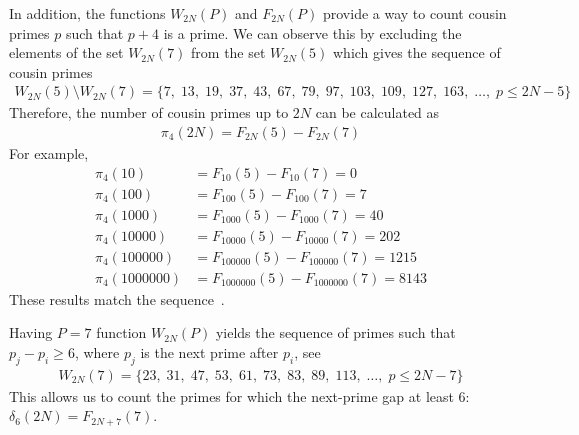 In addition, the functions $W_{2N}(P)$ and $F_{2N}(P)$ provide a way to count cousin
primes $p$ such that $p+4$ is a prime.
We can observe this by excluding the elements of the set $W_{2N}(7)$ from the set $W_{2N}(5)$ which gives
the sequence of cousin primes~\cite{oeis:A023200}
\begin{align*}
    W_{2N}(5) \setminus W_{2N}(7) = \{ 7, \; 13, \; 19, \; 37, \; 43, \; 67, \; 79, \; 97, \; 103, \; 109, \; 127, \; 163, \; \dots, \;  p \leq 2N - 5 \}
\end{align*}
Therefore, the number of cousin primes up to $2N$ can be calculated as
\begin{align*}
    \pi_4 (2N) = F_{2N}(5) - F_{2N}(7)
\end{align*}
For example,
\begin{align*}
    \pi_4 (10) &= F_{10}(5) - F_{10}(7) = 0 \\
    \pi_4 (100) &= F_{100}(5) - F_{100}(7) = 7 \\
    \pi_4 (1000) &= F_{1000}(5) - F_{1000}(7) = 40 \\
    \pi_4 (10000) &= F_{10000}(5) - F_{10000}(7) = 202 \\
    \pi_4 (100000) &= F_{100000}(5) - F_{100000}(7) = 1215 \\
    \pi_4 (1000000) &= F_{1000000}(5) - F_{1000000}(7) = 8143
\end{align*}
These results match the sequence~\cite{oeis:A093737}.

Having $P=7$ function $W_{2N}(P)$ yields the sequence of primes such that $p_j-p_i \geq 6$,
where $p_j$ is the next prime after $p_i$, see~\cite{oeis:A124582}
\begin{align*}
    W_{2N}(7) = \{ 23, \; 31, \;  47, \; 53, \; 61, \;  73, \; 83, \; 89, \; 113, \; \dots, \; p \leq 2N-7 \}
\end{align*}
This allows us to count the primes for which the next-prime gap at least 6: $\delta_6(2N) = F_{2N+7}(7)$.
